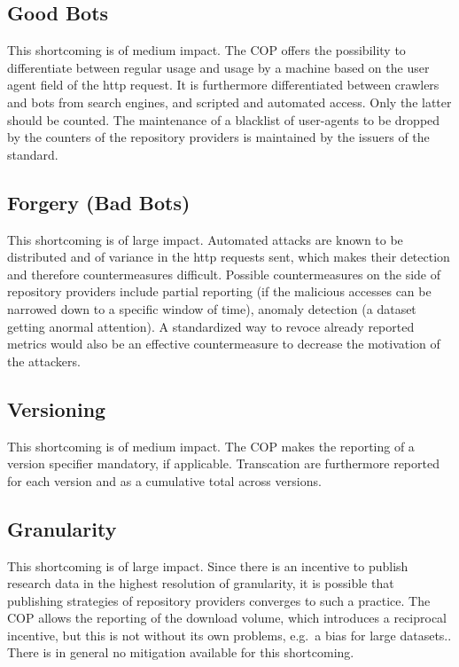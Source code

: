 \documentclass[conference, a4paper]{IEEEtran}\usepackage[]{graphicx}\usepackage[]{color}
\begin{document}
\subsection{Good Bots}

This shortcoming is of medium impact.
The COP offers the possibility to differentiate between regular usage
and usage by a machine based on the user agent field of the http request.
It is furthermore differentiated between crawlers and bots from search engines,
and scripted and automated access. Only the latter should be counted.
The maintenance of a blacklist of user-agents to be dropped by the counters
of the repository providers is maintained by the issuers of the standard.

\subsection{Forgery (Bad Bots)}

This shortcoming is of large impact.
Automated attacks are known to be distributed and of variance in the http requests sent,
which makes their detection and therefore countermeasures difficult.
Possible countermeasures on the side of repository providers include partial reporting
(if the malicious accesses can be narrowed down to a specific window of time),
anomaly detection (a dataset getting anormal attention).
A standardized way to revoce already reported metrics
would also be an effective countermeasure to decrease
the motivation of the attackers.

\subsection{Versioning}
This shortcoming is of medium impact.
The COP makes the reporting of a version specifier mandatory, if applicable.
Transcation are furthermore reported for each version
and as a cumulative total across versions.

\subsection{Granularity}
This shortcoming is of large impact.
Since there is an incentive to publish research data in the highest resolution of granularity,
it is possible that publishing strategies of repository providers converges
to such a practice.
The COP allows the reporting of the download volume, which introduces a reciprocal incentive,
but this is not without its own problems, e.g.\ a bias for large datasets..
There is in general no mitigation available for this shortcoming.
\end{document}
